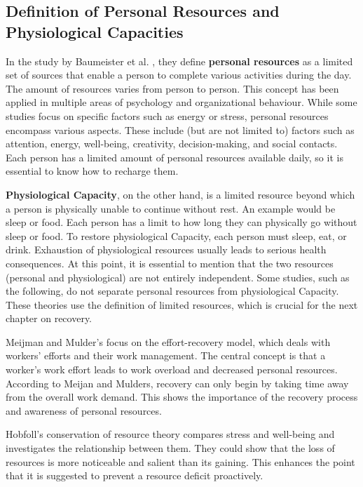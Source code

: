 \documentclass{hasel_thesis}
\begin{document}
\subsection{Definition of Personal Resources and Physiological Capacities}
In the study by 
Baumeister et al. \cite{BaumeisterR.F.BratslavskyE.MuravenM.&TiceD.M..1998}, they define \textbf{personal resources} as a limited set of sources that enable a person to complete various activities during the day. The amount of resources varies from person to person. This concept has been applied in multiple areas of psychology and organizational behaviour. While some studies focus on specific factors such as energy or stress, personal resources encompass various aspects. These include (but are not limited to) factors such as attention, energy, well-being, creativity, decision-making, and social contacts. Each person has a limited amount of personal resources available daily, so it is essential to know how to recharge them. 

\textbf{Physiological Capacity}, on the other hand, is a limited resource beyond which a person is physically unable to continue without rest. An example would be sleep or food. Each person has a limit to how long they can physically go without sleep or food. To restore physiological Capacity, each person must sleep, eat, or drink. Exhaustion of physiological resources usually leads to serious health consequences. At this point, it is essential to mention that the two resources (personal and physiological) are not entirely independent.
Some studies, such as the following, do not separate personal resources from physiological Capacity. These theories use the definition of limited resources, which is crucial for the next chapter on recovery.

Meijman and Mulder's \cite{Meijman.1998} focus on the effort-recovery model, which deals with workers' efforts and their work management. The central concept is that a worker's work effort leads to work overload and decreased personal resources. According to Meijan and Mulders, recovery can only begin by taking time away from the overall work demand. This shows the importance of the recovery process and awareness of personal resources.

Hobfoll's \cite{Hobfoll.1989, Hobfoll.1998} conservation of resource theory compares stress and well-being and investigates the relationship between them. They could show that the loss of resources is more noticeable and salient than its gaining. This enhances the point that it is suggested to prevent a resource deficit proactively.
\end{document}
